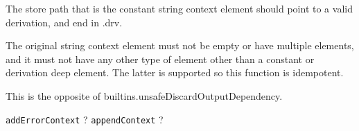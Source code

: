 \documentclass[9pt, a4paper, landscape]{extarticle}
\newcommand{\cmd}[1]{\texttt{#1}}
\begin{document}
\begin{multicols*}{3}
    The store path that is the constant string context element should point to a valid derivation, and end in .drv.

    The original string context element must not be empty or have multiple elements, and it must not have any other type of element other than a constant or derivation deep element. The latter is supported so this function is idempotent.

    This is the opposite of builtins.unsafeDiscardOutputDependency.
  
\cmd{addErrorContext} ?
\cmd{appendContext} ?


\end{multicols*}
\end{document}
